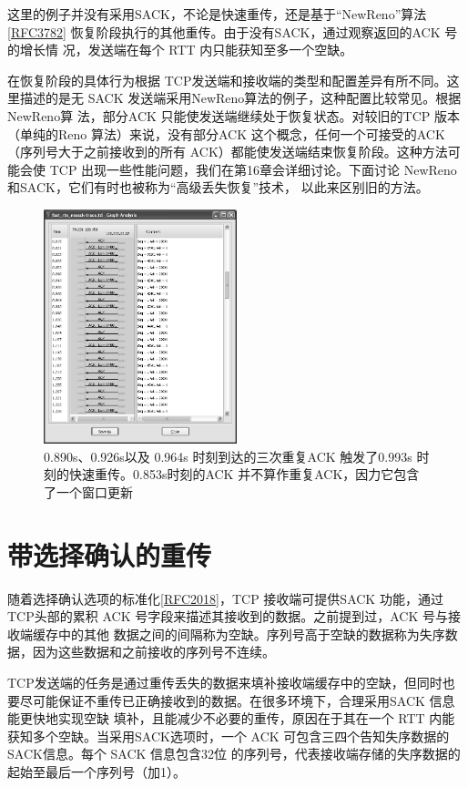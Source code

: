 这里的例子并没有采用SACK，不论是快速重传，还是基于“NewReno”算法\href{https://www.rfc-editor.org/rfc/rfc3782}{[RFC3782]}
恢复阶段执行的其他重传。由于没有SACK，通过观察返回的ACK 号的增长情
况，发送端在每个 RTT 内只能获知至多一个空缺。

在恢复阶段的具体行为根据 TCP发送端和接收端的类型和配置差异有所不同。这里描述的是无 SACK
发送端采用NewReno算法的例子，这种配置比较常见。根据NewReno算
法，部分ACK 只能使发送端继续处于恢复状态。对较旧的TCP 版本（单纯的Reno 算法）来说，没有部分ACK
这个概念，任何一个可接受的ACK（序列号大于之前接收到的所有
ACK）都能使发送端结束恢复阶段。这种方法可能会使 TCP 出现一些性能问题，我们在第16章会详细讨论。下面讨论
NewReno和SACK，它们有时也被称为“高级丢失恢复”技术，
以此来区别旧的方法。
\begin{figure}[!htb]
\centering
\includegraphics[width=0.5\textwidth]{imgs/14/14-8.png}
\caption{0.890s、0.926s以及 0.964s 时刻到达的三次重复ACK 触发了0.993s
时刻的快速重传。0.853s时刻的ACK 并不算作重复ACK，因力它包含了一个窗口更新}
\end{figure}

\section{带选择确认的重传}

随着选择确认选项的标准化\href{https://www.rfc-editor.org/rfc/rfc2018}{[RFC2018]}，TCP
接收端可提供SACK 功能，通过TCP头部的累积 ACK 号字段来描述其接收到的数据。之前提到过，ACK 号与接收端缓存中的其他
数据之间的间隔称为空缺。序列号高于空缺的数据称为失序数据，因为这些数据和之前接收的序列号不连续。

TCP发送端的任务是通过重传丢失的数据来填补接收端缓存中的空缺，但同时也要尽可能保证不重传已正确接收到的数据。在很多环境下，合理采用SACK
信息能更快地实现空缺
填补，且能减少不必要的重传，原因在于其在一个 RTT 内能获知多个空缺。当采用SACK选项时，一个 ACK
可包含三四个告知失序数据的SACK信息。每个 SACK 信息包含32位
的序列号，代表接收端存储的失序数据的起始至最后一个序列号（加1）。

